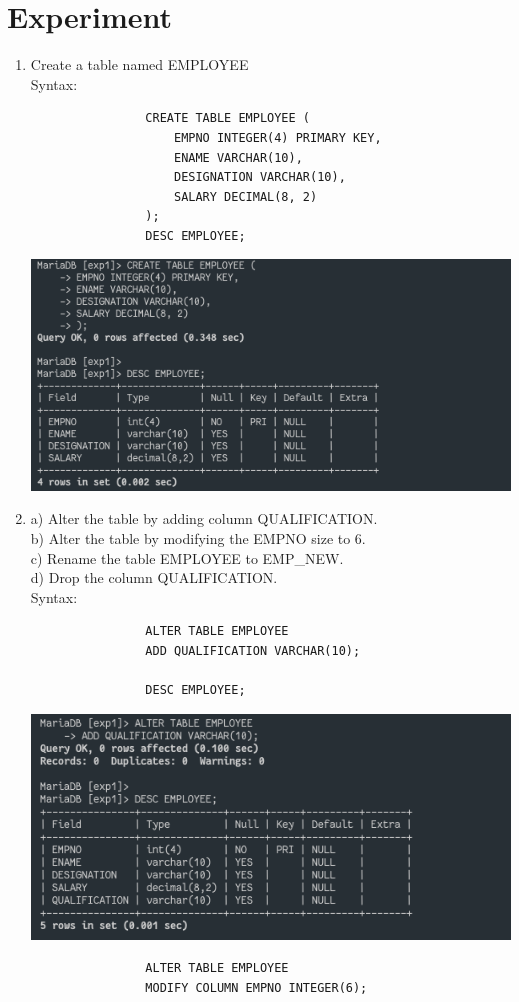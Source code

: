 \documentclass[13pt,oneside]{book}
\begin{document}
\section*{Experiment}
	\begin{enumerate}
		\item 
			Create a table named EMPLOYEE \\
			Syntax:
			\begin{verbatim}
				CREATE TABLE EMPLOYEE (
					EMPNO INTEGER(4) PRIMARY KEY,
					ENAME VARCHAR(10),
					DESIGNATION VARCHAR(10),
					SALARY DECIMAL(8, 2)
				);
				DESC EMPLOYEE;
			\end{verbatim}
			\includegraphics{img/p1/ss1.png}
		
			\item 
			a) Alter the table by adding column QUALIFICATION. \\
			b) Alter the table by modifying the EMPNO size to 6. \\
			c) Rename the table EMPLOYEE to EMP\_NEW. \\
			d) Drop the column QUALIFICATION.\\
			Syntax:
			\begin{verbatim}
				ALTER TABLE EMPLOYEE
				ADD QUALIFICATION VARCHAR(10);

				DESC EMPLOYEE;
			\end{verbatim}
			\includegraphics{img/p1/ss2.png}
			\begin{verbatim}
				ALTER TABLE EMPLOYEE
				MODIFY COLUMN EMPNO INTEGER(6);


\end{verbatim}
\end{enumerate}
\end{document}
